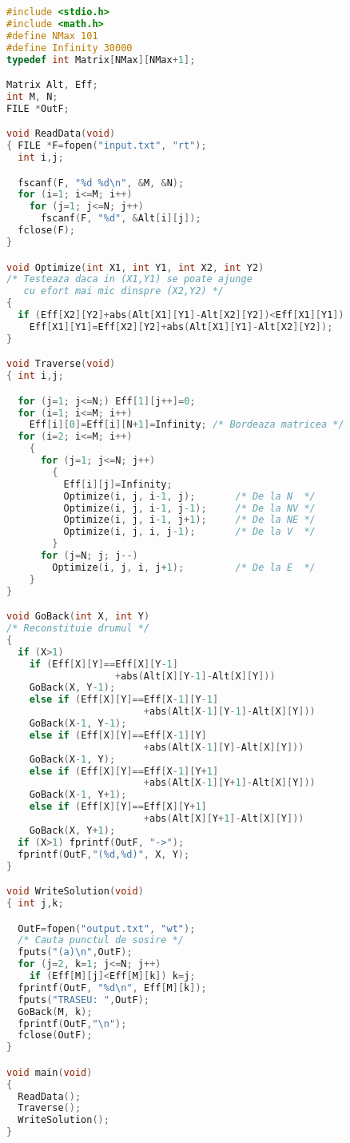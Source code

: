 \begin{lstlisting}[language=C]
#include <stdio.h>
#include <math.h>
#define NMax 101
#define Infinity 30000
typedef int Matrix[NMax][NMax+1];

Matrix Alt, Eff;
int M, N;
FILE *OutF;

void ReadData(void)
{ FILE *F=fopen("input.txt", "rt");
  int i,j;

  fscanf(F, "%d %d\n", &M, &N);
  for (i=1; i<=M; i++)
    for (j=1; j<=N; j++)
      fscanf(F, "%d", &Alt[i][j]);
  fclose(F);
}

void Optimize(int X1, int Y1, int X2, int Y2)
/* Testeaza daca in (X1,Y1) se poate ajunge
   cu efort mai mic dinspre (X2,Y2) */
{
  if (Eff[X2][Y2]+abs(Alt[X1][Y1]-Alt[X2][Y2])<Eff[X1][Y1])
    Eff[X1][Y1]=Eff[X2][Y2]+abs(Alt[X1][Y1]-Alt[X2][Y2]);
}

void Traverse(void)
{ int i,j;

  for (j=1; j<=N;) Eff[1][j++]=0;
  for (i=1; i<=M; i++)
    Eff[i][0]=Eff[i][N+1]=Infinity; /* Bordeaza matricea */
  for (i=2; i<=M; i++)
    {
      for (j=1; j<=N; j++)
        {
          Eff[i][j]=Infinity;
          Optimize(i, j, i-1, j);       /* De la N  */
          Optimize(i, j, i-1, j-1);     /* De la NV */
          Optimize(i, j, i-1, j+1);     /* De la NE */
          Optimize(i, j, i, j-1);       /* De la V  */
        }
      for (j=N; j; j--)
        Optimize(i, j, i, j+1);         /* De la E  */
    }
}

void GoBack(int X, int Y)
/* Reconstituie drumul */
{
  if (X>1)
    if (Eff[X][Y]==Eff[X][Y-1]
                   +abs(Alt[X][Y-1]-Alt[X][Y]))
    GoBack(X, Y-1);
    else if (Eff[X][Y]==Eff[X-1][Y-1]
                        +abs(Alt[X-1][Y-1]-Alt[X][Y]))
    GoBack(X-1, Y-1);
    else if (Eff[X][Y]==Eff[X-1][Y]
                        +abs(Alt[X-1][Y]-Alt[X][Y]))
    GoBack(X-1, Y);
    else if (Eff[X][Y]==Eff[X-1][Y+1]
                        +abs(Alt[X-1][Y+1]-Alt[X][Y]))
    GoBack(X-1, Y+1);
    else if (Eff[X][Y]==Eff[X][Y+1]
                        +abs(Alt[X][Y+1]-Alt[X][Y]))
    GoBack(X, Y+1);
  if (X>1) fprintf(OutF, "->");
  fprintf(OutF,"(%d,%d)", X, Y);
}

void WriteSolution(void)
{ int j,k;

  OutF=fopen("output.txt", "wt");
  /* Cauta punctul de sosire */
  fputs("(a)\n",OutF);
  for (j=2, k=1; j<=N; j++)
    if (Eff[M][j]<Eff[M][k]) k=j;
  fprintf(OutF, "%d\n", Eff[M][k]);
  fputs("TRASEU: ",OutF);
  GoBack(M, k);
  fprintf(OutF,"\n");
  fclose(OutF);
}

void main(void)
{
  ReadData();
  Traverse();
  WriteSolution();
}
\end{lstlisting}
